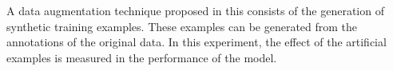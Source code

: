 
A data augmentation technique proposed in this \thesisdiss{}
consists of the generation of synthetic training examples.
These examples can be generated from the annotations of the
original data. In this experiment, the effect of the
artificial examples is measured in the performance of the
model.
